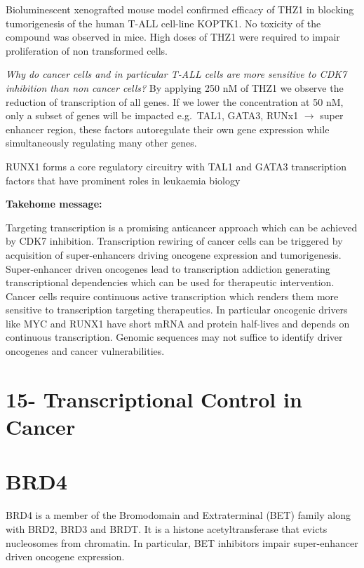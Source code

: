 Bioluminescent xenografted mouse model confirmed efficacy of THZ1 in blocking tumorigenesis of the human T-ALL cell-line KOPTK1. No toxicity of the compound was observed in mice. High doses of THZ1 were required to impair proliferation of non transformed cells.

\emph{Why do cancer cells and in particular T-ALL cells are more sensitive to CDK7 inhibition than non cancer cells?} By applying 250 nM of THZ1 we observe the reduction of transcription of all genes. If we lower the concentration at 50 nM, only a subset of genes will be impacted e.g.~TAL1, GATA3, RUNx1 $\rightarrow$ super enhancer region, these factors autoregulate their own gene expression while simultaneously regulating many other genes.

 RUNX1 forms a core regulatory circuitry with TAL1 and GATA3 transcription factors that have prominent roles in leukaemia biology

\textbf{Takehome message:}

Targeting transcription is a promising anticancer approach which can be achieved by CDK7 inhibition. Transcription rewiring of cancer cells can be triggered by acquisition of super-enhancers driving oncogene expression and tumorigenesis. Super-enhancer driven oncogenes lead to transcription addiction generating transcriptional dependencies which can be used for therapeutic intervention. Cancer cells require continuous active transcription which renders them more sensitive to transcription targeting therapeutics. In particular oncogenic drivers like MYC and RUNX1 have short mRNA and protein half-lives and depends on continuous transcription. Genomic sequences may not suffice to identify driver oncogenes and cancer vulnerabilities.

\hypertarget{transcriptional-control-in-cancer}{%
\section{15- Transcriptional Control in Cancer}\label{transcriptional-control-in-cancer}}

\hypertarget{brd4}{%
\section{BRD4}\label{brd4}}

BRD4 is a member of the Bromodomain and Extraterminal (BET) family along
with BRD2, BRD3 and BRDT. It is a histone acetyltransferase that evicts nucleosomes from chromatin. In particular, BET inhibitors impair super-enhancer driven oncogene expression.


